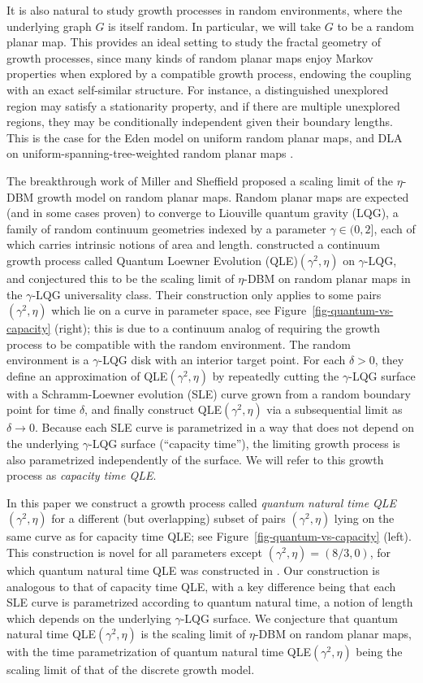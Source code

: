 \documentclass[a4paper]{article}
\numberwithin{equation}{section}
\theoremstyle{remark}
\numberwithin{equation}{section}
\begin{document}
It is also natural to study growth processes in random environments, where the underlying graph $G$ is itself random. In particular, we will take $G$ to be a random planar map. This provides an ideal setting to study the fractal geometry of growth processes, since many kinds of random planar maps enjoy Markov properties when explored by a compatible growth process, endowing the coupling with an exact self-similar structure. For instance, a distinguished unexplored region may satisfy a stationarity property, and if there are multiple unexplored regions, they may be conditionally independent given their boundary lengths. This is the case for the Eden model on uniform random planar maps, and DLA on uniform-spanning-tree-weighted random planar maps \cite{ms-qle}.

The breakthrough work of Miller and Sheffield \cite{ms-qle} proposed a scaling limit of the $\eta$-DBM growth model on random planar maps. Random planar maps are expected (and in some cases proven) to converge to Liouville quantum gravity (LQG), a family of random continuum geometries indexed by a parameter $\gamma \in (0,2]$, each of which carries intrinsic notions of area and length. \cite{ms-qle} constructed a continuum growth process called Quantum Loewner Evolution (QLE)$(\gamma^2, \eta)$ on $\gamma$-LQG, and conjectured this to be the scaling limit of $\eta$-DBM on random planar maps in the $\gamma$-LQG universality class. Their construction only applies to some pairs $(\gamma^2, \eta)$ which lie on a curve in parameter space, see Figure~\ref{fig-quantum-vs-capacity} (right); this is due to a continuum analog of requiring the growth process to be compatible with the random environment. The random environment is a $\gamma$-LQG disk with an interior target point. For each $\delta > 0$, they define an approximation of QLE$(\gamma^2, \eta)$ by repeatedly cutting the $\gamma$-LQG surface with a Schramm-Loewner evolution (SLE) curve grown from a random boundary point for time $\delta$, and finally construct QLE$(\gamma^2, \eta)$ via a subsequential limit as $\delta \to 0$. Because each SLE curve is parametrized in a way that does not depend on the underlying $\gamma$-LQG surface (``capacity time''), the limiting growth process is also parametrized independently of the surface. We will refer to this growth process as \emph{capacity time QLE}.

In this paper we construct a growth process called \emph{quantum natural time QLE$(\gamma^2, \eta)$} for a different (but overlapping) subset of pairs $(\gamma^2, \eta)$ lying on the same curve as for capacity time QLE; see Figure~\ref{fig-quantum-vs-capacity} (left). 
This construction is novel for all parameters except $(\gamma^2, \eta) = (8/3, 0)$, for which quantum natural time QLE was constructed in \cite{ms-equivalence}. Our construction is analogous to that of capacity time QLE, with a key difference being that each SLE curve is parametrized according to {quantum natural time}, a notion of length which depends on the underlying $\gamma$-LQG surface. 
We conjecture that quantum natural time QLE$(\gamma^2, \eta)$ is the scaling limit of $\eta$-DBM on random planar maps, with the time parametrization of quantum natural time QLE$(\gamma^2, \eta)$ being the scaling limit of that of the discrete growth model.
\end{document}
